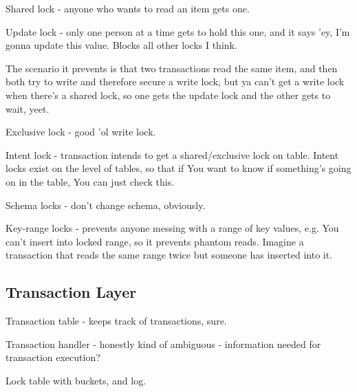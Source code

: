 \documentclass{article}
\begin{document}
		Shared lock - anyone who wants to read an item gets one.
		
		Update lock - only one person at a time gets to hold this one, and it says 'ey, I'm gonna update this value. Blocks all other locks I think.
		
		The scenario it prevents is that two transactions read the same item, and then both try to write and therefore secure a write lock, but ya can't get a write lock when there's a shared lock, so one gets the update lock and the other gets to wait, yeet.
		
		Exclusive lock - good 'ol write lock.
		
		Intent lock - transaction intends to get a shared/exclusive lock on table. Intent locks exist on the level of tables, so that if You want to know if something's going on in the table, You can just check this.
		
		Schema locks - don't change schema, obviously.
		
		Key-range locks - prevents anyone messing with a range of key values, e.g. You can't insert into locked range, so it prevents phantom reads. Imagine a transaction that reads the same range twice but someone has inserted into it.
		
	\subsection{Transaction Layer}
	
		Transaction table - keeps track of transactions, sure. 
		
		Transaction handler - honestly kind of ambiguous - information needed for transaction execution?
		
		Lock table with buckets, and log. 
		
		
		
		
		
		
		
		
		
		
			
			
			
			
			

	
				
				
				
				
				
				
				
				
				
				
                                                                                                                                   		
\end{document}
